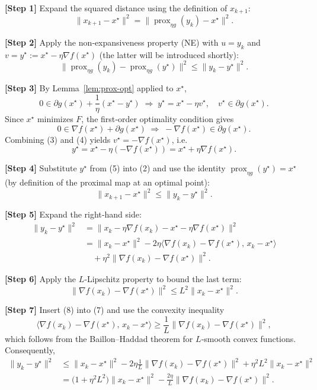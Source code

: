 \documentclass[11pt]{article}
\newcommand{\prox}{\operatorname{prox}}
\begin{document}
\begin{enumerate}[label={(\alph*)}]
\bigskip
\noindent\textbf{[Step 1]} Expand the squared distance using the definition of $x_{k+1}$:
\[
\|x_{k+1}-x^{\star}\|^{2}
= \|\prox_{\eta g}(y_{k})-x^{\star}\|^{2}.
\tag{1}
\]

\noindent\textbf{[Step 2]} Apply the non‑expansiveness property (NE) with $u=y_{k}$ and $v=y^{\star}:=x^{\star}-\eta\nabla f(x^{\star})$ (the latter will be introduced shortly):
\[
\|\prox_{\eta g}(y_{k})-\prox_{\eta g}(y^{\star})\|^{2}
\le \|y_{k}-y^{\star}\|^{2}.
\tag{2}
\]

\noindent\textbf{[Step 3]} By Lemma~\ref{lem:prox-opt} applied to $x^{\star}$,
\[
0\in\partial g(x^{\star})+\frac{1}{\eta}(x^{\star}-y^{\star})
\;\Longrightarrow\;
y^{\star}=x^{\star}-\eta v^{\star},
\quad v^{\star}\in\partial g(x^{\star}).
\tag{3}
\]
Since $x^{\star}$ minimizes $F$, the first‑order optimality condition gives
\[
0\in\nabla f(x^{\star})+\partial g(x^{\star})
\;\Longrightarrow\;
-\nabla f(x^{\star})\in\partial g(x^{\star}).
\tag{4}
\]
Combining (3) and (4) yields $v^{\star}=-\nabla f(x^{\star})$, i.e.
\[
y^{\star}=x^{\star}-\eta(-\nabla f(x^{\star}))
= x^{\star}+\eta\nabla f(x^{\star}).
\tag{5}
\]

\noindent\textbf{[Step 4]} Substitute $y^{\star}$ from (5) into (2) and use the identity $\prox_{\eta g}(y^{\star})=x^{\star}$ (by definition of the proximal map at an optimal point):
\[
\|x_{k+1}-x^{\star}\|^{2}
\le \|y_{k}-y^{\star}\|^{2}.
\tag{6}
\]

\noindent\textbf{[Step 5]} Expand the right‑hand side:
\[
\begin{aligned}
\|y_{k}-y^{\star}\|^{2}
&= \bigl\|x_{k}-\eta\nabla f(x_{k})-x^{\star}-\eta\nabla f(x^{\star})\bigr\|^{2}\\
&= \|x_{k}-x^{\star}\|^{2}
-2\eta\langle\nabla f(x_{k})-\nabla f(x^{\star}),\,x_{k}-x^{\star}\rangle\\
&\quad+\eta^{2}\|\nabla f(x_{k})-\nabla f(x^{\star})\|^{2}.
\end{aligned}
\tag{7}
\]

\noindent\textbf{[Step 6]} Apply the $L$‑Lipschitz property to bound the last term:
\[
\|\nabla f(x_{k})-\nabla f(x^{\star})\|^{2}
\le L^{2}\|x_{k}-x^{\star}\|^{2}.
\tag{8}
\]

\noindent\textbf{[Step 7]} Insert (8) into (7) and use the convexity inequality
\[
\langle\nabla f(x_{k})-\nabla f(x^{\star}),\,x_{k}-x^{\star}\rangle
\ge \frac{1}{L}\|\nabla f(x_{k})-\nabla f(x^{\star})\|^{2},
\tag{9}
\]
which follows from the Baillon–Haddad theorem for $L$‑smooth convex functions. Consequently,
\[
\begin{aligned}
\|y_{k}-y^{\star}\|^{2}
&\le \|x_{k}-x^{\star}\|^{2}
-2\eta\frac{1}{L}\|\nabla f(x_{k})-\nabla f(x^{\star})\|^{2}
+\eta^{2}L^{2}\|x_{k}-x^{\star}\|^{2}\\
&= \bigl(1+\eta^{2}L^{2}\bigr)\|x_{k}-x^{\star}\|^{2}
-\frac{2\eta}{L}\|\nabla f(x_{k})-\nabla f(x^{\star})\|^{2}.
\end{aligned}
\tag{10}
\]


\end{enumerate}
\end{document}

